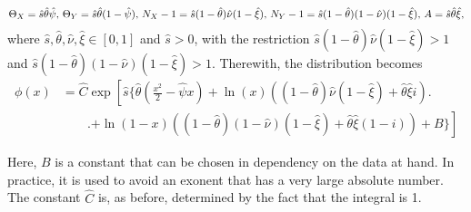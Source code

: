 	\begin{equation*}
		\Theta_X = \hat{s}\hat{\theta}\hat{\psi}\textnormal{, }\Theta_Y = \hat{s}\hat{\theta}(1-\hat{\psi})\textnormal{, }N_X - 1 = \hat{s}(1-\hat{\theta})\hat{\nu}(1-\hat{\xi})\textnormal{, }N_Y - 1 = \hat{s}(1-\hat{\theta})(1-\hat{\nu})(1-\hat{\xi})\textnormal{, }A=\hat{s}\hat{\theta}\hat{\xi},
	\end{equation*}
	where $\hat{s},\hat{\theta},\hat{\nu},\hat{\xi} \in \left[0,1\right]$ and $\hat{s} > 0$, with the restriction $\hat{s}(1-\hat{\theta})\hat{\nu}(1-\hat{\xi}) > 1$ and $\hat{s}(1-\hat{\theta})(1-\hat{\nu})(1-\hat{\xi}) > 1.$ Therewith, the distribution becomes
	\begin{align*}
		\phi(x) &= \hat{C}\exp\left[\hat{s}\Big\{\hat{\theta}\left(\frac{x^2}{2} - \hat{\psi}x\right)+\ln(x)\left((1-\hat{\theta})\hat{\nu}(1-\hat{\xi})+\hat{\theta}\hat{\xi}i\right)\right.\Big.\\
			&\qquad \Big.\left.+ \ln(1-x)\left((1-\hat{\theta})(1-\hat{\nu})(1-\hat{\xi})+\hat{\theta}\hat{\xi}(1-i)\right) + B\Big\}\right]
	\end{align*}
		
	Here, $B$ is a constant that can be chosen in dependency on the data at hand. In practice, it is used to avoid an exonent that has a very large absolute number. The constant $\hat{C}$ is, as before, determined by the fact that the integral is 1.